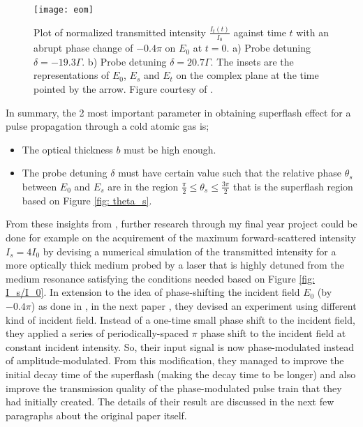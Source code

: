 \newpage

\begin{figure}[h!]
    \centering
    \texttt{[image: eom]}
    \caption{Plot of normalized transmitted intensity $\frac{I_{t}(t)}{I_{0}}$ against time $t$ with an abrupt phase change of $-0.4\pi$ on $E_{0}$ at $t = 0$. a) Probe detuning $\delta = -19.3\Gamma$. b) Probe detuning $\delta = 20.7\Gamma$. The insets are the representations of $E_{0}$, $E_{s}$ and $E_{t}$ on the complex plane at the time pointed by the arrow. Figure courtesy of \cite{Kwong2014}.}
    \label{fig: eom}
\end{figure}

In summary, the 2 most important parameter in obtaining superflash effect for a pulse propagation through a cold atomic gas is;

\begin{itemize}
    \item The optical thickness $b$ must be high enough.
    \item The probe detuning $\delta$ must have certain value such that the relative phase $\theta_{s}$ between $E_{0}$ and $E_{s}$ are in the region $\frac{\pi}{2} \leq \theta_{s} \leq \frac{3\pi}{2}$ that is the superflash region based on Figure \ref{fig: theta_s}.
\end{itemize}

From these insights from \cite{Kwong2014}, further research through my final year project could be done for example on the acquirement of the maximum forward-scattered intensity $I_{s} = 4 I_{0}$ by devising a numerical simulation of the transmitted intensity for a more optically thick medium probed by a laser that is highly detuned from the medium resonance satisfying the conditions needed based on Figure \ref{fig: I_s/I_0}. In extension to the idea of phase-shifting the incident field $E_{0}$ (by $-0.4\pi$) as done in \cite{Kwong2014}, in the next paper \cite{Kwong2015}, they devised an experiment using different kind of incident field. Instead of a one-time small phase shift to the incident field, they applied a series of periodically-spaced $\pi$ phase shift to the incident field at constant incident intensity. So, their input signal is now phase-modulated instead of amplitude-modulated. From this modification, they managed to improve the initial decay time of the superflash (making the decay time to be longer) and also improve the transmission quality of the phase-modulated pulse train that they had initially created. The details of their result are discussed in the next few paragraphs about the original paper \cite{Kwong2015} itself.\\

